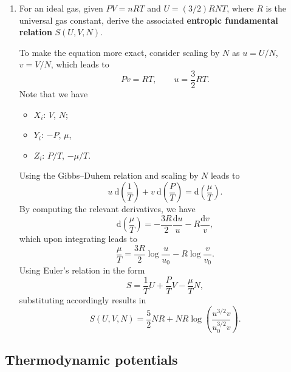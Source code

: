 \documentclass[letter-paper]{tufte-book}
\newcommand\Def[1]{\textbf{#1}}
\begin{document}
\begin{enumerate}
  \item For an ideal gas, given $PV = nRT$ and $U = (3/2)RNT$, where $R$ is the
  universal gas constant, derive the associated \Def{entropic fundamental
  relation} $S(U,V,N)$.

  To make the equation more exact, consider scaling by $N$ as $u = U/N$, $v =
  V/N$, which leads to
  \begin{equation*}
    Pv = RT, \qquad u = \frac{3}{2}RT.
  \end{equation*}
  Note that we have
  \begin{itemize}
    \item $X_i$: $V$, $N$;
    \item $Y_i$: $-P$, $\mu$,
    \item $Z_i$: $P/T$, $-\mu / T$.
  \end{itemize}
  Using the Gibbs--Duhem relation and scaling by $N$ leads to
  \begin{equation*}
    u\ \mathrm{d}\left(\frac{1}{T}\right) + v\ \mathrm{d}\left(\frac{P}{T}\right) = \mathrm{d}\left(\frac{\mu}{T}\right).
  \end{equation*}
  By computing the relevant derivatives, we have
  \begin{equation*}
    \mathrm{d}\left(\frac{\mu}{T}\right) = -\frac{3R}{2}\frac{\mathrm{d}u}{u} - R\frac{\mathrm{d}v}{v},
  \end{equation*}
  which upon integrating leads to
  \begin{equation*}
    \frac{\mu}{T} = \frac{3R}{2} \log\frac{u}{u_0} - R \log\frac{v}{v_0}.
  \end{equation*}
  Using Euler's relation in the form
  \begin{equation*}
    S = \frac{1}{T}U + \frac{P}{T}V - \frac{\mu}{T}N,
  \end{equation*}
  substituting accordingly results in
  \begin{equation*}
    S(U,V,N) = \frac{5}{2}NR + NR \log\left(\frac{u^{3/2}v}{u_0^{3/2}v}\right).
  \end{equation*}
\end{enumerate}


\subsection{Thermodynamic potentials}
\end{document}
